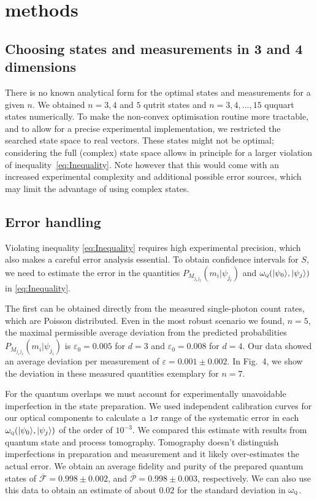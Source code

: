 \documentclass[aps,prl,floatfix,twocolumn,tightenlines,amsmath,amssymb,nofootinbib]{revtex4-1}
\newcommand{\ket}[1] {| #1 \rangle}
\newcommand{\ve} {\varepsilon}
\begin{document}
\section{methods}

\subsection{Choosing states and measurements in 3 and 4 dimensions}
There is no known analytical form for the optimal states and measurements for a given $n$. We obtained $n=3, 4$ and $5$ qutrit states and $n=3,4,...,15$ ququart states numerically. To make the non-convex optimisation routine more tractable, and to allow for a precise experimental implementation, we restricted the searched state space to real vectors. These states might not be optimal; considering the full (complex) state space allows in principle for a larger violation\cite{Barrett2014,Branciard2014a} of inequality~\eqref{eq:Inequality}.
Note however that this would come with an increased experimental complexity and additional possible error sources, which may limit the advantage of using complex states.


\subsection{Error handling}
Violating inequality \eqref{eq:Inequality} requires high experimental precision, which also makes a careful error analysis essential. To obtain confidence intervals for $S$, we need to estimate the error in the quantities $P_{M_{j_1j_2}}(m_i | \psi_{j_i})$ and $\omega_{\textsc{q}}(\ket{\psi_0},\ket{\psi_j})$ in \eqref{eq:Inequality}. 

The first can be obtained directly from the measured single-photon count rates, which are Poisson distributed. Even in the most robust scenario we found, $n=5$, the maximal permissible average deviation from the predicted probabilities\cite{Branciard2014a}  $P_{M_{j_1j_2}}(m_i | \psi_{j_i})$ is $\ve_0=0.005$ for $d=3$ and $\ve_0=0.008$ for $d=4$. Our data showed an average deviation per measurement of $\ve=0.001 \pm 0.002$. In Fig.~4, we show the deviation in these measured quantities exemplary for $n=7$.

For the quantum overlaps we must account for experimentally unavoidable imperfection in the state preparation. We used independent calibration curves for our optical components to calculate a $1\sigma$ range of the systematic error in each $\omega_{\textsc{q}}(\ket{\psi_0},\ket{\psi_j})$ of the order of $10^{-3}$. We compared this estimate with results from quantum state and process tomography\cite{james2001mq}. Tomography doesn't distinguish imperfections in preparation and measurement and it likely over-estimates the actual error. We obtain an average fidelity and purity of the prepared quantum states of $\overline{\mathcal{F}}=0.998 \pm 0.002$, and $\overline{\mathcal{P}}=0.998 \pm 0.003$, respectively. We can also use this data to obtain an estimate of about $0.02$ for the standard deviation in $\omega_{\textsc{q}}$.
\end{document}
